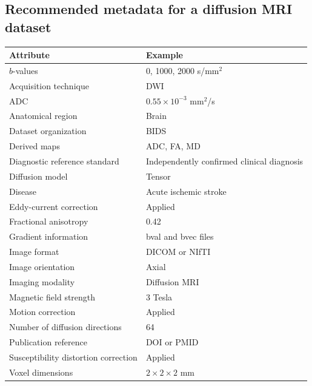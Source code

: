 \subsection{Recommended metadata for a diffusion MRI dataset}
\begin{longtable}{@{}p{}p{}@{}}
\toprule
\textbf{Attribute} & \textbf{Example} \\
\midrule
$b$-values & 0, 1000, 2000 s/mm$^2$ \\
Acquisition technique & DWI \\
ADC & $0.55 \times 10^{-3}$ mm$^2$/s \\
Anatomical region & Brain \\
Dataset organization & BIDS \\
Derived maps & ADC, FA, MD \\
Diagnostic reference standard & Independently confirmed clinical diagnosis \\
Diffusion model & Tensor \\
Disease & Acute ischemic stroke \\
Eddy-current correction & Applied \\
Fractional anisotropy & 0.42 \\
Gradient information & bval and bvec files \\
Image format & DICOM or NIfTI \\
Image orientation & Axial \\
Imaging modality & Diffusion MRI \\
Magnetic field strength & 3 Tesla \\
Motion correction & Applied \\
Number of diffusion directions & 64 \\
Publication reference & DOI or PMID \\
Susceptibility distortion correction & Applied \\
Voxel dimensions & $2 \times 2 \times 2$ mm \\
\bottomrule
\end{longtable}

